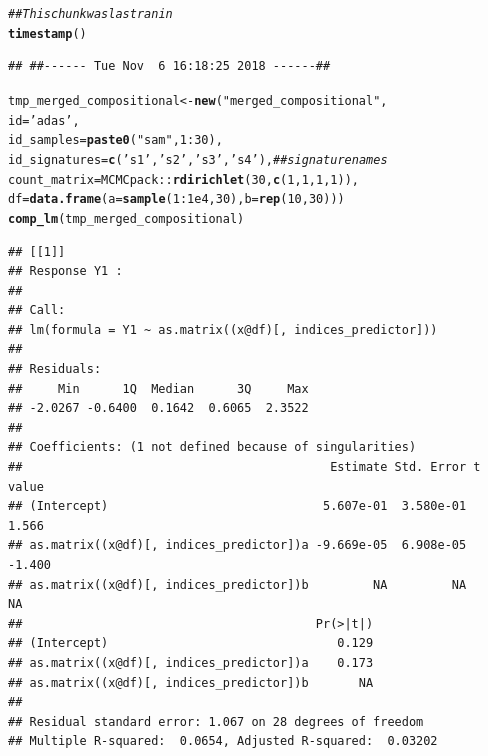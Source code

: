 \documentclass{article}\usepackage[]{graphicx}\usepackage[]{color}
\makeatletter
\newcommand{\hlnum}[1]{\textcolor[rgb]{0.686,0.059,0.569}{#1}}%
\newcommand{\hlstr}[1]{\textcolor[rgb]{0.192,0.494,0.8}{#1}}%
\newcommand{\hlcom}[1]{\textcolor[rgb]{0.678,0.584,0.686}{\textit{#1}}}%
\newcommand{\hlopt}[1]{\textcolor[rgb]{0,0,0}{#1}}%
\newcommand{\hlstd}[1]{\textcolor[rgb]{0.345,0.345,0.345}{#1}}%
\newcommand{\hlkwb}[1]{\textcolor[rgb]{0.69,0.353,0.396}{#1}}%
\newcommand{\hlkwc}[1]{\textcolor[rgb]{0.333,0.667,0.333}{#1}}%
\newcommand{\hlkwd}[1]{\textcolor[rgb]{0.737,0.353,0.396}{\textbf{#1}}}%
\newenvironment{kframe}{%
 \def\at@end@of@kframe{}%
 \ifinner\ifhmode%
  \def\at@end@of@kframe{\end{minipage}}%
  \begin{minipage}{\columnwidth}%
 \fi\fi%
 \def\FrameCommand##1{\hskip\@totalleftmargin \hskip-\fboxsep
 \colorbox{shadecolor}{##1}\hskip-\fboxsep
     \hskip-\linewidth \hskip-\@totalleftmargin \hskip\columnwidth}%
 \MakeFramed {\advance\hsize-\width
   \@totalleftmargin\z@ \linewidth\hsize
   \@setminipage}}%
 {\par\unskip\endMakeFramed%
 \at@end@of@kframe}
\newenvironment{knitrout}{}{} %
\makeatother
\begin{document}
\begin{knitrout}
\color{fgcolor}\begin{kframe}
\begin{alltt}
\hlcom{## This chunk was last ran in}
\hlkwd{timestamp}\hlstd{()}
\end{alltt}
\begin{verbatim}
## ##------ Tue Nov  6 16:18:25 2018 ------##
\end{verbatim}
\begin{alltt}
\hlstd{tmp_merged_compositional} \hlkwb{<-} \hlkwd{new}\hlstd{(}\hlstr{"merged_compositional"}\hlstd{,}
                                \hlkwc{id}\hlstd{=}\hlstr{'adas'}\hlstd{,}
                                \hlkwc{id_samples}\hlstd{=}\hlkwd{paste0}\hlstd{(}\hlstr{"sam"}\hlstd{,} \hlnum{1}\hlopt{:}\hlnum{30}\hlstd{),}
                                \hlkwc{id_signatures}\hlstd{=} \hlkwd{c}\hlstd{(}\hlstr{'s1'}\hlstd{,} \hlstr{'s2'}\hlstd{,} \hlstr{'s3'}\hlstd{,} \hlstr{'s4'}\hlstd{),} \hlcom{## signature names}
                                \hlkwc{count_matrix}\hlstd{=MCMCpack}\hlopt{::}\hlkwd{rdirichlet}\hlstd{(}\hlnum{30}\hlstd{,} \hlkwd{c}\hlstd{(}\hlnum{1}\hlstd{,}\hlnum{1}\hlstd{,}\hlnum{1}\hlstd{,}\hlnum{1}\hlstd{)),}
                                \hlkwc{df}\hlstd{=}\hlkwd{data.frame}\hlstd{(}\hlkwc{a}\hlstd{=}\hlkwd{sample}\hlstd{(}\hlnum{1}\hlopt{:}\hlnum{1e4}\hlstd{,} \hlnum{30}\hlstd{),} \hlkwc{b}\hlstd{=}\hlkwd{rep}\hlstd{(}\hlnum{10}\hlstd{,} \hlnum{30}\hlstd{)))}
\hlkwd{comp_lm}\hlstd{(tmp_merged_compositional)}
\end{alltt}
\begin{verbatim}
## [[1]]
## Response Y1 :
## 
## Call:
## lm(formula = Y1 ~ as.matrix((x@df)[, indices_predictor]))
## 
## Residuals:
##     Min      1Q  Median      3Q     Max 
## -2.0267 -0.6400  0.1642  0.6065  2.3522 
## 
## Coefficients: (1 not defined because of singularities)
##                                           Estimate Std. Error t value
## (Intercept)                              5.607e-01  3.580e-01   1.566
## as.matrix((x@df)[, indices_predictor])a -9.669e-05  6.908e-05  -1.400
## as.matrix((x@df)[, indices_predictor])b         NA         NA      NA
##                                         Pr(>|t|)
## (Intercept)                                0.129
## as.matrix((x@df)[, indices_predictor])a    0.173
## as.matrix((x@df)[, indices_predictor])b       NA
## 
## Residual standard error: 1.067 on 28 degrees of freedom
## Multiple R-squared:  0.0654,	Adjusted R-squared:  0.03202 

\end{verbatim}
\end{kframe}
\end{knitrout}
\end{document}
